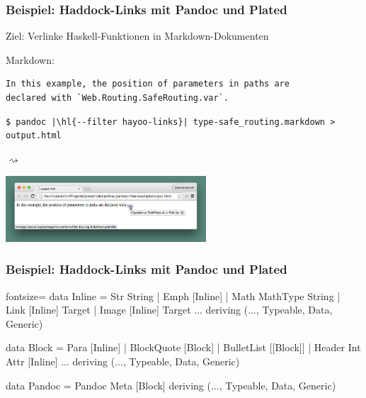 \documentclass{beamer}
\newcommand{\ev}{$\rightsquigarrow$} %
\newcommand{\hl}[1]{\colorbox{yellow}{#1}} %
\begin{document}
\begin{frame}[fragile]
  \frametitle{Beispiel: Haddock-Links mit Pandoc und Plated}
  Ziel: Verlinke Haskell-Funktionen in Markdown-Dokumenten

  \begin{mdframed}[backgroundcolor=blue!10]
    {\scriptsize Markdown:}
    \begin{verbatim}
In this example, the position of parameters in paths are
declared with `Web.Routing.SafeRouting.var`.
    \end{verbatim}
  \end{mdframed}

  \begin{verbatim}
$ pandoc |\hl{--filter hayoo-links}| type-safe_routing.markdown > output.html
  \end{verbatim}

  \vspace{12pt}

  {\huge \ev} \enspace \begin{minipage}[t]{0.5 \linewidth}
    \vspace{-10pt}
    \includegraphics[width=7.5cm]{images/hayoo-links-screenshot.jpg}
  \end{minipage}
\end{frame}

\begin{frame}[fragile]
  \frametitle{Beispiel: Haddock-Links mit Pandoc und Plated}
  \begin{haskellcode*}{fontsize=\small}
data Inline
  = Str String
  | Emph [Inline]
  | Math MathType String
  | Link [Inline] Target
  | Image [Inline] Target
    ...
  deriving (..., Typeable, Data, Generic)

data Block
  = Para [Inline]
  | BlockQuote [Block]
  | BulletList [[Block]]
  | Header Int Attr [Inline]
    ...
  deriving (..., Typeable, Data, Generic)

data Pandoc = Pandoc Meta [Block]
  deriving (..., Typeable, Data, Generic)
  \end{haskellcode*}
\end{frame}
\end{document}

